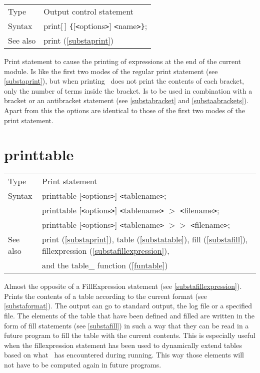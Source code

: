 \noindent \begin{tabular}{ll}
Type & Output control statement\\
Syntax & print[\,] \verb:{:[{\tt<}options{\tt>}] {\tt<}name{\tt>}\verb:}:;
\\ See also & print (\ref{substaprint})
\end{tabular}\vspace{4mm}

\noindent Print statement to cause the printing 
of expressions at the end of the current module. Is like the first two 
modes of the regular print statement (see \ref{substaprint}), but when 
printing \FORM\ does not print the contents of each bracket, 
only the number of terms inside the bracket. Is to be used in combination 
with a bracket or an antibracket statement (see 
\ref{substabracket} and \ref{substaabrackets}). Apart from this the options 
are identical to those of the first two modes of the print statement. 
\vspace{10mm}


\section{printtable}
\label{substaprinttable}

\noindent \begin{tabular}{ll}
Type & Print statement\\
Syntax & printtable [{\tt<}options{\tt>}] {\tt<}tablename{\tt>};  \\
       & printtable [{\tt<}options{\tt>}] {\tt<}tablename{\tt>} $>$ {\tt<}filename{\tt>}; \\
       & printtable [{\tt<}options{\tt>}] {\tt<}tablename{\tt>} $>\!\!>$ {\tt<}filename{\tt>};
\\ See also & print (\ref{substaprint}),
            table (\ref{substatable}),
            fill (\ref{substafill}),
            fillexpression (\ref{substafillexpression}), \\ &
            and the table\_ function (\ref{funtable})
\end{tabular}\vspace{4mm}

\noindent Almost the opposite of a 
FillExpression statement (see 
\ref{substafillexpression}). Prints the contents of a 
table according to the current format (see 
\ref{substaformat}). The output can go to standard output, the 
log file or a specified file. The elements of 
the table that have been defined and filled are written in the form of 
fill statements (see \ref{substafill}) in such a way that they 
can be read in a future program to fill the table with the current 
contents. This is especially useful when the fillexpression statement has 
been used to dynamically extend tables based on what \FORM\ has encountered 
during running. This way those elements will not have to be computed again 
in future programs. 

